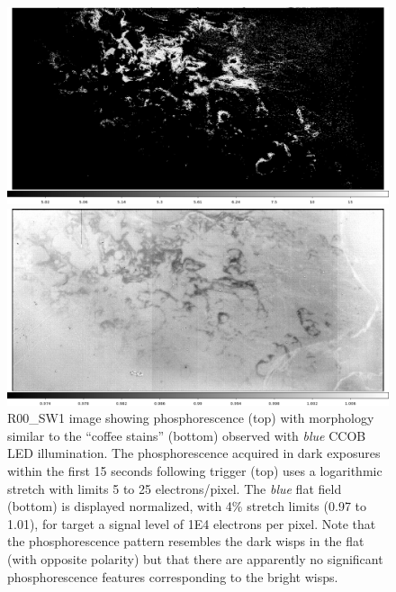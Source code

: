 \begin{figure}
\centering
\begin{minipage}{1.0\textwidth}    
  \centering
  \includegraphics[width=.95\linewidth]{sections/figures/phosphorescence-survey/stains_phos.png}    
\end{minipage}
\begin{minipage}{1.0\textwidth}
  \centering
  \includegraphics[width=.95\linewidth]{sections/figures/phosphorescence-survey/stains_abs.png}
\end{minipage}
\caption{R00\_SW1 image showing phosphorescence (top) with morphology similar to the ``coffee stains'' (bottom) observed with {\it blue} CCOB LED illumination. The phosphorescence acquired in dark exposures within the first 15 seconds following trigger (top) uses a logarithmic stretch with limits 5 to 25 electrons/pixel. The {\it blue} flat field (bottom) is displayed normalized, with 4\% stretch limits (0.97 to 1.01), for target a signal level of 1E4 electrons per pixel. Note that the phosphorescence pattern resembles the dark wisps in the flat (with opposite polarity) but that there are apparently no significant phosphorescence features corresponding to the bright wisps.}
\label{fig:phos:stains}
\end{figure}

